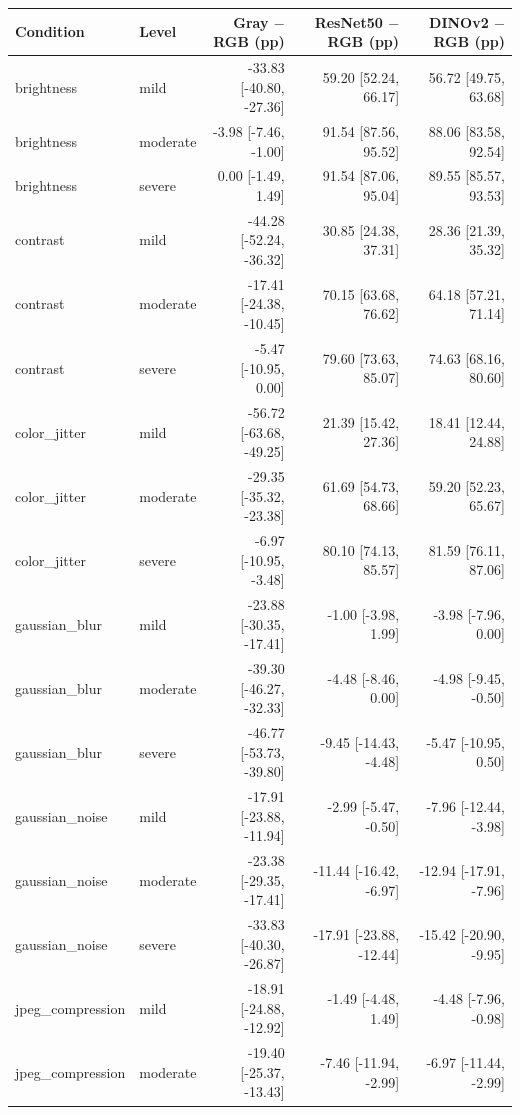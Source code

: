 \begin{tabular}{llrrr}
\toprule
Condition & Level & \makecell{Gray $-$ RGB\\(pp)} & \makecell{ResNet50 $-$ RGB\\(pp)} & \makecell{DINOv2 $-$ RGB\\(pp)} \\
\midrule
brightness & mild & -33.83 [-40.80, -27.36] & 59.20 [52.24, 66.17] & 56.72 [49.75, 63.68] \\
brightness & moderate & -3.98 [-7.46, -1.00] & 91.54 [87.56, 95.52] & 88.06 [83.58, 92.54] \\
brightness & severe & 0.00 [-1.49, 1.49] & 91.54 [87.06, 95.04] & 89.55 [85.57, 93.53] \\
contrast & mild & -44.28 [-52.24, -36.32] & 30.85 [24.38, 37.31] & 28.36 [21.39, 35.32] \\
contrast & moderate & -17.41 [-24.38, -10.45] & 70.15 [63.68, 76.62] & 64.18 [57.21, 71.14] \\
contrast & severe & -5.47 [-10.95, 0.00] & 79.60 [73.63, 85.07] & 74.63 [68.16, 80.60] \\
color\_jitter & mild & -56.72 [-63.68, -49.25] & 21.39 [15.42, 27.36] & 18.41 [12.44, 24.88] \\
color\_jitter & moderate & -29.35 [-35.32, -23.38] & 61.69 [54.73, 68.66] & 59.20 [52.23, 65.67] \\
color\_jitter & severe & -6.97 [-10.95, -3.48] & 80.10 [74.13, 85.57] & 81.59 [76.11, 87.06] \\
gaussian\_blur & mild & -23.88 [-30.35, -17.41] & -1.00 [-3.98, 1.99] & -3.98 [-7.96, 0.00] \\
gaussian\_blur & moderate & -39.30 [-46.27, -32.33] & -4.48 [-8.46, 0.00] & -4.98 [-9.45, -0.50] \\
gaussian\_blur & severe & -46.77 [-53.73, -39.80] & -9.45 [-14.43, -4.48] & -5.47 [-10.95, 0.50] \\
gaussian\_noise & mild & -17.91 [-23.88, -11.94] & -2.99 [-5.47, -0.50] & -7.96 [-12.44, -3.98] \\
gaussian\_noise & moderate & -23.38 [-29.35, -17.41] & -11.44 [-16.42, -6.97] & -12.94 [-17.91, -7.96] \\
gaussian\_noise & severe & -33.83 [-40.30, -26.87] & -17.91 [-23.88, -12.44] & -15.42 [-20.90, -9.95] \\
jpeg\_compression & mild & -18.91 [-24.88, -12.92] & -1.49 [-4.48, 1.49] & -4.48 [-7.96, -0.98] \\
jpeg\_compression & moderate & -19.40 [-25.37, -13.43] & -7.46 [-11.94, -2.99] & -6.97 [-11.44, -2.99] \\

\end{tabular}
